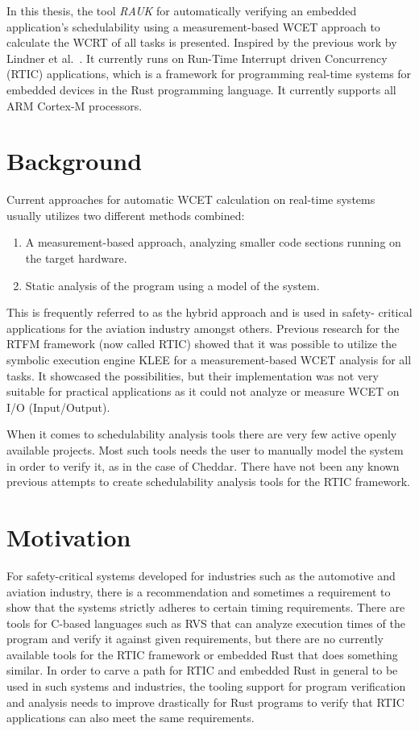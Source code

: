 In this thesis, the tool \emph{RAUK} for automatically verifying an embedded
application's schedulability using a measurement-based WCET approach to
calculate the WCRT of all tasks is presented. Inspired by the previous work by
Lindner et al.\ \cite{lindner}. It currently runs on Run-Time Interrupt driven
Concurrency (RTIC) applications, which is a framework for programming real-time
systems for embedded devices in the Rust programming language. It currently
supports all ARM Cortex-M processors.

\section{Background}
Current approaches for automatic WCET calculation on real-time systems usually
utilizes two different methods combined:
\begin{enumerate}
    \item A measurement-based approach, analyzing smaller code sections running
        on the target hardware.
    \item Static analysis of the program using a model of the system.
\end{enumerate}
This is frequently referred to as the hybrid approach and is used in safety-
critical applications for the aviation industry\cite{rapita} amongst others.
Previous research for the RTFM framework (now called RTIC) showed that it was
possible to utilize the symbolic execution engine KLEE\cite{kleepaper} for a
measurement-based WCET analysis for all tasks\cite{lindner}. It showcased the
possibilities, but their implementation was not very suitable for practical
applications as it could not analyze or measure WCET on I/O (Input/Output).

When it comes to schedulability analysis tools there are very few active openly
available projects. Most such tools needs the user to manually model the system
in order to verify it, as in the case of Cheddar\cite{cheddar}. There have not
been any known previous attempts to create schedulability analysis tools for
the RTIC framework.

\section{Motivation}
For safety-critical systems developed for industries such as the automotive and
aviation industry, there is a recommendation and sometimes a requirement to
show that the systems strictly adheres to certain timing requirements. There
are tools for C-based languages such as RVS\cite{rapita} that can analyze
execution times of the program and verify it against given requirements, but
there are no currently available tools for the RTIC framework or embedded Rust
that does something similar. In order to carve a path for RTIC and embedded
Rust in general to be used in such systems and industries, the tooling support
for program verification and analysis needs to improve drastically for Rust
programs to verify that RTIC applications can also meet the same requirements.


